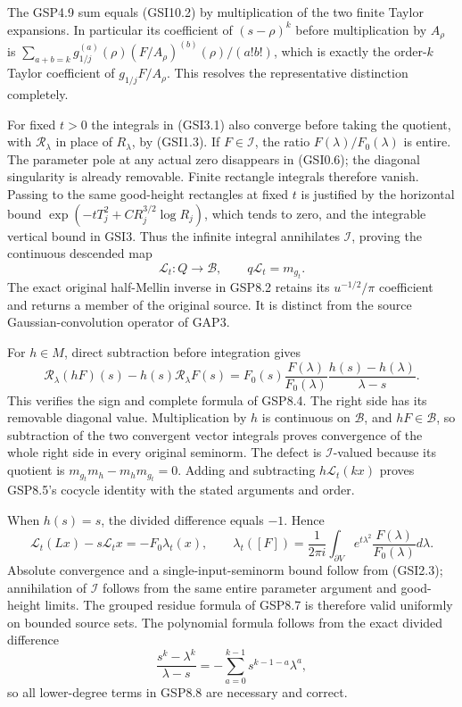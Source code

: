 The GSP4.9 sum equals (GSI10.2) by multiplication of the two finite
Taylor expansions. In particular its coefficient of \((s-\rho)^k\)
before multiplication by \(A_\rho\) is
\(\sum_{a+b=k}g_{1/j}^{(a)}(\rho)(F/A_\rho)^{(b)}(\rho)/(a!b!)\), which
is exactly the order-\(k\) Taylor coefficient of \(g_{1/j}F/A_\rho\).
This resolves the representative distinction completely.

For fixed \(t>0\) the integrals in (GSI3.1) also converge before taking
the quotient, with \(\mathscr R_\lambda\) in place of \(R_\lambda\), by
(GSI1.3). If \(F\in\mathcal I\), the ratio \(F(\lambda)/F_0(\lambda)\)
is entire. The parameter pole at any actual zero disappears in (GSI0.6);
the diagonal singularity is already removable. Finite rectangle
integrals therefore vanish. Passing to the same good-height rectangles
at fixed \(t\) is justified by the horizontal bound
\(\exp(-tT_j^2+C R_j^{3/2}\log R_j)\), which tends to zero, and the
integrable vertical bound in GSI3. Thus the infinite integral
annihilates \(\mathcal I\), proving the continuous descended map \[
\mathcal L_t:Q\longrightarrow\mathcal B,
\qquad q\mathcal L_t=m_{g_t}.
\tag{GSI12.1}
\] The exact original half-Mellin inverse in GSP8.2 retains its
\(u^{-1/2}/\pi\) coefficient and returns a member of the original
source. It is distinct from the source Gaussian-convolution operator of
GAP3.

For \(h\in M\), direct subtraction before integration gives \[
\mathscr R_\lambda(hF)(s)-h(s)\mathscr R_\lambda F(s)
=F_0(s)\frac{F(\lambda)}{F_0(\lambda)}
\frac{h(s)-h(\lambda)}{\lambda-s}.
\tag{GSI12.2}
\] This verifies the sign and complete formula of GSP8.4. The right side
has its removable diagonal value. Multiplication by \(h\) is continuous
on \(\mathcal B\), and \(hF\in\mathcal B\), so subtraction of the two
convergent vector integrals proves convergence of the whole right side
in every original seminorm. The defect is \(\mathcal I\)-valued because
its quotient is \(m_{g_t}m_h-m_hm_{g_t}=0\). Adding and subtracting
\(h\mathcal L_t(kx)\) proves GSP8.5's cocycle identity with the stated
arguments and order.

When \(h(s)=s\), the divided difference equals \(-1\). Hence \[
\mathcal L_t(Lx)-s\mathcal L_tx=-F_0\lambda_t(x),
\qquad
\lambda_t([F])=\frac1{2\pi i}\int_{\partial V}
e^{t\lambda^2}\frac{F(\lambda)}{F_0(\lambda)}d\lambda.
\tag{GSI12.3}
\] Absolute convergence and a single-input-seminorm bound follow from
(GSI2.3); annihilation of \(\mathcal I\) follows from the same entire
parameter argument and good-height limits. The grouped residue formula
of GSP8.7 is therefore valid uniformly on bounded source sets. The
polynomial formula follows from the exact divided difference \[
\frac{s^k-\lambda^k}{\lambda-s}
=-\sum_{a=0}^{k-1}s^{k-1-a}\lambda^a,
\tag{GSI12.4}
\] so all lower-degree terms in GSP8.8 are necessary and correct.

